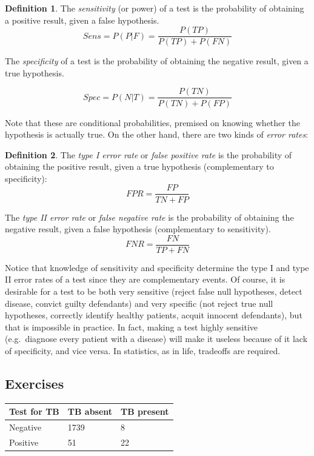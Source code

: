 \documentclass[
]{book}
\theoremstyle{definition}
\newtheorem{definition}{Definition}[chapter]
\theoremstyle{definition}
\theoremstyle{definition}
\theoremstyle{remark}
\begin{document}
\begin{definition}
\protect\hypertarget{def:def-sens}{}{\label{def:def-sens} }
The \emph{sensitivity} (or power) of a test is the probability of obtaining a positive result, given a false hypothesis.
\[ Sens = P(P | F) = \frac{P(TP)}{P(TP) + P(FN)} \]

The \emph{specificity} of a test is the probability of obtaining the negative result, given a true hypothesis.

\[ Spec = P(N | T) = \frac{P(TN)}{P(TN) + P(FP)} \]
\end{definition}

Note that these are conditional probabilities, premised on knowing whether the hypothesis is actually true. On the other hand, there are two kinds of \emph{error rates}:

\begin{definition}
\protect\hypertarget{def:def-error-rates}{}{\label{def:def-error-rates} }The \emph{type I error rate} or \emph{false positive rate} is the probability of obtaining the positive result, given a true hypothesis (complementary to specificity):
\[FPR = \frac{FP}{TN+FP}\]

The \emph{type II error rate} or \emph{false negative rate} is the probability of obtaining the negative result, given a false hypothesis (complementary to sensitivity).
\[FNR = \frac{FN}{TP+FN}\]
\end{definition}

Notice that knowledge of sensitivity and specificity determine the type I and type II error rates of a test since they are complementary events. Of course, it is desirable for a test to be both very sensitive (reject false null hypotheses, detect disease, convict guilty defendants) and very specific (not reject true null hypotheses, correctly identify healthy patients, acquit innocent defendants), but that is impossible in practice. In fact, making a test highly sensitive (e.g.~diagnose every patient with a disease) will make it useless because of it lack of specificity, and vice versa. In statistics, as in life, tradeoffs are required.

\hypertarget{exercises-25}{%
\subsection{Exercises}\label{exercises-25}}

\begin{longtable}[]{@{}lll@{}}
\toprule
Test for TB & TB absent & TB present\tabularnewline
\midrule
\endhead
Negative & 1739 & 8\tabularnewline
Positive & 51 & 22\tabularnewline
\bottomrule
\end{longtable}
\end{document}

